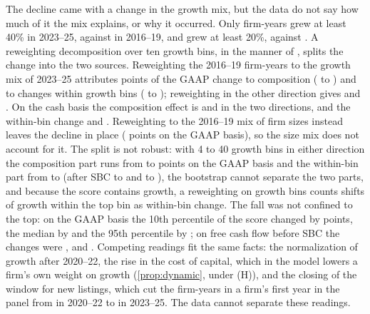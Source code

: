 The decline came with a change in the growth mix, but the data do not say how much of it the mix explains, or why it occurred. Only \FortyCellLate{} firm-years grew at least 40\% in 2023--25, against \FortyCellEarly{} in 2016--19, and \TwentyCellLate{} grew at least 20\%, against \TwentyCellEarly. A reweighting decomposition over ten growth bins, in the manner of \citet{dinardo1996labor}, splits the change into the two sources. Reweighting the 2016--19 firm-years to the growth mix of 2023--25 attributes \RwOpCompositionB{} points of the GAAP change to composition (\RwOpCompositionBLo{} to \RwOpCompositionBHi) and \RwOpWithinB{} to changes within growth bins (\RwOpWithinBLo{} to \RwOpWithinBHi); reweighting in the other direction gives \RwOpCompositionA{} and \RwOpWithinA. On the cash basis the composition effect is \RwCashCompositionB{} and \RwCashCompositionA{} in the two directions, and the within-bin change \RwCashWithinB{} and \RwCashWithinA. Reweighting to the 2016--19 mix of firm sizes instead leaves the decline in place (\RwOpWithinSize{} points on the GAAP basis), so the size mix does not account for it. The split is not robust: with 4 to 40 growth bins in either direction the composition part runs from \BinCompOpLo{} to \BinCompOpHi{} points on the GAAP basis and the within-bin part from \BinWithinOpLo{} to \BinWithinOpHi{} (after SBC \BinCompCashLo{} to \BinCompCashHi{} and \BinWithinCashLo{} to \BinWithinCashHi), the bootstrap cannot separate the two parts, and because the score contains growth, a reweighting on growth bins counts shifts of growth within the top bin as within-bin change. The fall was not confined to the top: on the GAAP basis the 10th percentile of the score changed by \QShiftOpTen{} points, the median by \QShiftOpFifty{} and the 95th percentile by \QShiftOpNinetyFive; on free cash flow before SBC the changes were \QShiftFcfTen, \QShiftFcfFifty{} and \QShiftFcfNinetyFive. Competing readings fit the same facts: the normalization of growth after 2020--22, the rise in the cost of capital, which in the model lowers a firm's own weight on growth (\autoref{prop:dynamic}, under (H)), and the closing of the window for new listings, which cut the firm-years in a firm's first year in the panel from \FirstYearTwentyTwentyTwo{} in 2020--22 to \FirstYearTwentyThreeTwentyFive{} in 2023--25. The data cannot separate these readings.

